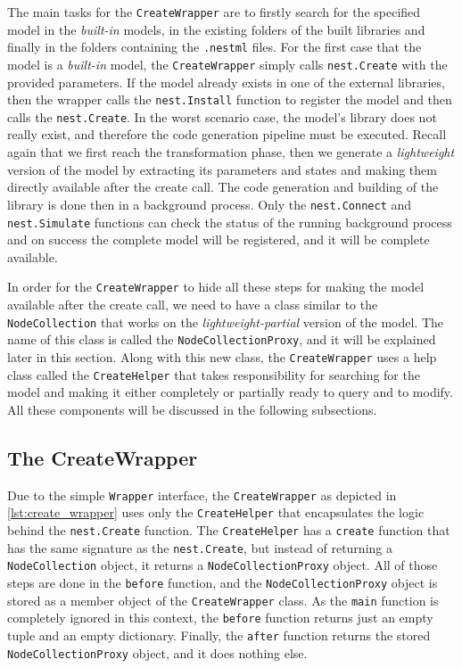 The main tasks for the \texttt{CreateWrapper} are to firstly search for the specified model in the \emph{built-in} models, in the existing folders of the built libraries and finally in the folders containing the \texttt{.nestml} files. For the first case that the model is a \emph{built-in} model, the \texttt{CreateWrapper} simply calls \texttt{nest.Create} with the provided parameters. If the model already exists in one of the external libraries, then the wrapper calls the \texttt{nest.Install} function to register the model and then calls the \texttt{nest.Create}. In the worst scenario case, the model's library does not really exist, and therefore the code generation pipeline must be executed. Recall again that we first reach the transformation phase, then we generate a \emph{lightweight} version of the model by extracting its parameters and states and making them  directly available after the create call. The code generation and building  of the library is done then in a background process. Only the \texttt{nest.Connect} and \texttt{nest.Simulate} functions can check the status of the running background process and on success the complete model will be registered, and it will be complete available.


In order for the \texttt{CreateWrapper} to hide all these steps for making the model available after the create call, we need to have a class similar to the \texttt{NodeCollection} that works on the \emph{lightweight-partial} version of the model. The name of this class is called the \texttt{NodeCollectionProxy}, and it will be explained later in this section. Along with this new class, the \texttt{CreateWrapper} uses a help class called the \texttt{CreateHelper} that takes responsibility for searching for the model and making it either completely or partially ready to query and to modify. All these components will be discussed in the following subsections.

\subsection{The CreateWrapper}

Due to the simple \texttt{Wrapper} interface, the \texttt{CreateWrapper} as depicted in \autoref{lst:create_wrapper} uses only the \texttt{CreateHelper} that encapsulates the logic behind the \texttt{nest.Create} function. The \texttt{CreateHelper} has a \texttt{create} function that has the same signature as the  \texttt{nest.Create}, but instead of returning a \texttt{NodeCollection} object, it returns a \texttt{NodeCollectionProxy} object. All of those steps are done in the \texttt{before} function, and the \texttt{NodeCollectionProxy} object is stored as a member object of the \texttt{CreateWrapper} class. As the \texttt{main} function is completely ignored in this context, the \texttt{before} function returns just an empty tuple and an empty dictionary. Finally, the \texttt{after} function returns the stored \texttt{NodeCollectionProxy} object, and it does nothing else.

